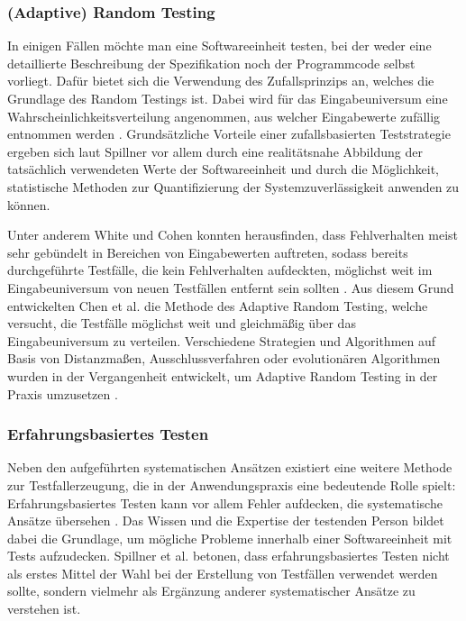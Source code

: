 \subsubsection{(Adaptive) Random Testing}\label{subsub:randomTesting}

In einigen Fällen möchte man eine Softwareeinheit testen, bei der weder eine detaillierte Beschreibung der Spezifikation noch der Programmcode selbst vorliegt. Dafür bietet sich die Verwendung des Zufallsprinzips an, welches die Grundlage des Random Testings ist. Dabei wird für das Eingabeuniversum eine Wahrscheinlichkeitsverteilung angenommen, aus welcher Eingabewerte zufällig entnommen werden \cite[S. 141 f.]{spillner2011software}. Grundsätzliche Vorteile einer zufallsbasierten Teststrategie ergeben sich laut Spillner \cite[S. 142]{spillner2011software} vor allem durch eine realitätsnahe Abbildung der tatsächlich verwendeten Werte der Softwareeinheit und durch die Möglichkeit, statistische Methoden zur Quantifizierung der Systemzuverlässigkeit anwenden zu können.

Unter anderem White und Cohen \cite{white1980domain} konnten herausfinden, dass Fehlverhalten meist sehr gebündelt in Bereichen von Eingabewerten auftreten, sodass bereits durchgeführte Testfälle, die kein Fehlverhalten aufdeckten, möglichst weit im Eingabeuniversum von neuen Testfällen entfernt sein sollten \cite{survey2013}. Aus diesem Grund entwickelten Chen et al. \cite{chen2004adaptive} die Methode des Adaptive Random Testing, welche versucht, die Testfälle möglichst weit und gleichmäßig über das Eingabeuniversum zu verteilen. Verschiedene Strategien und Algorithmen auf Basis von Distanzmaßen, Ausschlussverfahren oder evolutionären Algorithmen wurden in der Vergangenheit entwickelt, um Adaptive Random Testing in der Praxis umzusetzen \cite{huang2012adaptive}.

\subsubsection{Erfahrungsbasiertes Testen}\label{subsub:erfahrungsbasiertesTesten}

Neben den aufgeführten systematischen Ansätzen existiert eine weitere Methode zur Testfallerzeugung, die in der Anwendungspraxis eine bedeutende Rolle spielt: Erfahrungsbasiertes Testen kann vor allem Fehler aufdecken, die systematische Ansätze übersehen \cite[S. 210]{spillner2010basiswissen}. Das Wissen und die Expertise der testenden Person bildet dabei die Grundlage, um mögliche Probleme innerhalb einer Softwareeinheit mit Tests aufzudecken. Spillner et al. \cite[S. 213]{spillner2010basiswissen} betonen, dass erfahrungsbasiertes Testen nicht als erstes Mittel der Wahl bei der Erstellung von Testfällen verwendet werden sollte, sondern vielmehr als Ergänzung anderer systematischer Ansätze zu verstehen ist. 

